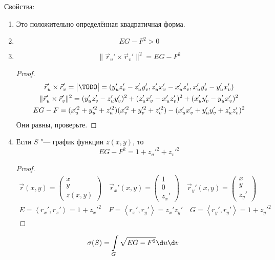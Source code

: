 Свойства:
\begin{enumerate}
\item
	Это положительно определённая квадратичная форма.

\item
	\[ EG - F^2 > 0 \]

\item
	\[ \|\vec r_u' \times \vec r_v' \|^2 = EG - F^2 \]
	\begin{proof}
		\begin{gather*}
			\vec r_u' \times \vec r_v'
			= \begin{vmatrix} \TODO \end{vmatrix}
			= (y_u' z_v' - z_u' y_v', z_u' x_v' - x_u' z_v', x_u' y_v' - y_u' x_v') \\
			 \|\vec r_u' \times \vec r_v' \|^2
			= (y_u' z_v' - z_u' y_v')^2 + (z_u' x_v' - x_u' z_v')^2 + (x_u' y_v' - y_u' x_v')^2 \\
			EG - F = (x_u'^2 + y_u'^2 + z_u'^2)(x_v'^2 + y_v'^2 + z_v'^2) - (x_u'x_v' + y_u'y_v' + z_u'z_v')^2
		\end{gather*}
		Они равны, проверьте.
	\end{proof}

\item
	Если $S$ "--- график функции $z(x,y)$, то
	\[ EG - F^2 = 1 + z_u'^2 + z_v'^2 \]
	\begin{proof}
		\begin{gather*}
			\vec r(x, y) = \begin{pmatrix} x \\ y \\ z(x, y) \end{pmatrix} \quad
			\vec r_x'(x, y) = \begin{pmatrix} 1 \\ 0 \\ z_x' \end{pmatrix} \quad
			\vec r_y'(x, y) = \begin{pmatrix} x \\ y \\ z_y' \end{pmatrix} \\
			E = \left< r_x', r_x' \right> = 1 + z_x'^2 \quad
			F = \left< r_x', r_y' \right> = z_x'z_y' \quad
			G = \left< r_y', r_y' \right> = 1 + z_y'^2
		\end{gather*}
	\end{proof}
\end{enumerate}

\begin{conseq}
	\[
		\sigma(S) = \int\limits_G \sqrt{EG - F^2} \d u \d v
	\]
\end{conseq}

